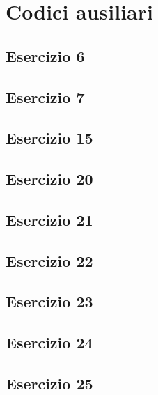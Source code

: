 \section{Codici ausiliari}

\subsection{Esercizio 6}


\subsection{Esercizio 7}


\subsection{Esercizio 15}


\subsection{Esercizio 20}


\subsection{Esercizio 21}


\subsection{Esercizio 22}


\subsection{Esercizio 23}


\subsection{Esercizio 24}


\subsection{Esercizio 25}

